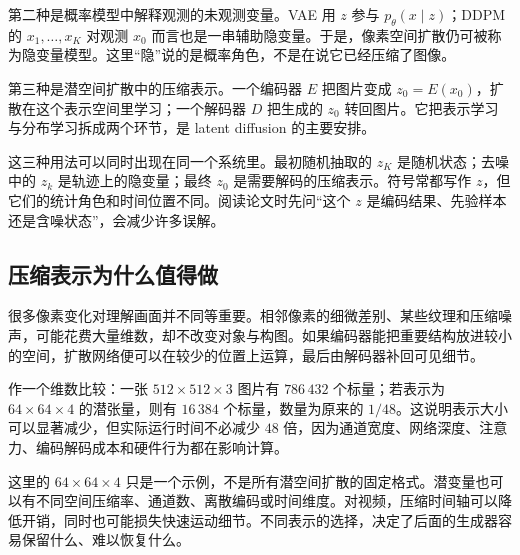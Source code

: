 第二种是概率模型中解释观测的未观测变量。VAE 用 $z$ 参与 $p_\theta(x\mid z)$；DDPM 的 $x_1,\ldots,x_K$ 对观测 $x_0$ 而言也是一串辅助隐变量。于是，像素空间扩散仍可被称为隐变量模型。这里“隐”说的是概率角色，不是在说它已经压缩了图像。

第三种是潜空间扩散中的压缩表示。一个编码器 $E$ 把图片变成 $z_0=E(x_0)$，扩散在这个表示空间里学习；一个解码器 $D$ 把生成的 $z_0$ 转回图片。它把表示学习与分布学习拆成两个环节，是 latent diffusion 的主要安排。\cite{c_rombach2022ldm}

这三种用法可以同时出现在同一个系统里。最初随机抽取的 $z_K$ 是随机状态；去噪中的 $z_k$ 是轨迹上的隐变量；最终 $z_0$ 是需要解码的压缩表示。符号常都写作 $z$，但它们的统计角色和时间位置不同。阅读论文时先问“这个 $z$ 是编码结果、先验样本还是含噪状态”，会减少许多误解。

\subsection{压缩表示为什么值得做}

很多像素变化对理解画面并不同等重要。相邻像素的细微差别、某些纹理和压缩噪声，可能花费大量维数，却不改变对象与构图。如果编码器能把重要结构放进较小的空间，扩散网络便可以在较少的位置上运算，最后由解码器补回可见细节。

作一个维数比较：一张 $512\times512\times3$ 图片有 $786\,432$ 个标量；若表示为 $64\times64\times4$ 的潜张量，则有 $16\,384$ 个标量，数量为原来的 $1/48$。这说明表示大小可以显著减少，但实际运行时间不必减少 $48$ 倍，因为通道宽度、网络深度、注意力、编码解码成本和硬件行为都在影响计算。

这里的 $64\times64\times4$ 只是一个示例，不是所有潜空间扩散的固定格式。潜变量也可以有不同空间压缩率、通道数、离散编码或时间维度。对视频，压缩时间轴可以降低开销，同时也可能损失快速运动细节。不同表示的选择，决定了后面的生成器容易保留什么、难以恢复什么。


